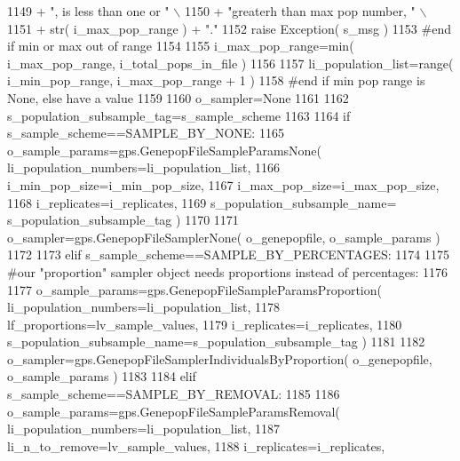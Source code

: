 \begin{DoxyCode}
1149                         + \textcolor{stringliteral}{", is less than one or "} \(\backslash\)
1150                         + \textcolor{stringliteral}{"greaterh than max pop number, "} \(\backslash\)
1151                         + str( i\_max\_pop\_range ) + \textcolor{stringliteral}{"."} 
1152             \textcolor{keywordflow}{raise} Exception( s\_msg )
1153         \textcolor{comment}{#end if min or max out of range}
1154 
1155         i\_max\_pop\_range=min( i\_max\_pop\_range, i\_total\_pops\_in\_file )
1156 
1157         li\_population\_list=range( i\_min\_pop\_range, i\_max\_pop\_range + 1 )
1158     \textcolor{comment}{#end if min pop range is None, else have a value}
1159 
1160     o\_sampler=\textcolor{keywordtype}{None}  
1161 
1162     s\_population\_subsample\_tag=s\_sample\_scheme
1163 
1164     \textcolor{keywordflow}{if} s\_sample\_scheme==SAMPLE\_BY\_NONE:
1165         o\_sample\_params=gps.GenepopFileSampleParamsNone( li\_population\_numbers=li\_population\_list,
1166                                                             i\_min\_pop\_size=i\_min\_pop\_size,
1167                                                             i\_max\_pop\_size=i\_max\_pop\_size,
1168                                                             i\_replicates=i\_replicates,
1169                                                             s\_population\_subsample\_name=
      s\_population\_subsample\_tag )    
1170 
1171         o\_sampler=gps.GenepopFileSamplerNone( o\_genepopfile, o\_sample\_params )
1172 
1173     \textcolor{keywordflow}{elif} s\_sample\_scheme==SAMPLE\_BY\_PERCENTAGES:
1174 
1175         \textcolor{comment}{#our "proportion" sampler object needs proportions instead of percentages:}
1176 
1177         o\_sample\_params=gps.GenepopFileSampleParamsProportion( li\_population\_numbers=li\_population\_list,
1178                                                 lf\_proportions=lv\_sample\_values,
1179                                                 i\_replicates=i\_replicates,
1180                                                 s\_population\_subsample\_name=s\_population\_subsample\_tag )
1181 
1182         o\_sampler=gps.GenepopFileSamplerIndividualsByProportion( o\_genepopfile, o\_sample\_params )
1183 
1184     \textcolor{keywordflow}{elif} s\_sample\_scheme==SAMPLE\_BY\_REMOVAL:
1185 
1186         o\_sample\_params=gps.GenepopFileSampleParamsRemoval( li\_population\_numbers=li\_population\_list,
1187                                                 li\_n\_to\_remove=lv\_sample\_values,
1188                                                 i\_replicates=i\_replicates,

\end{DoxyCode}
